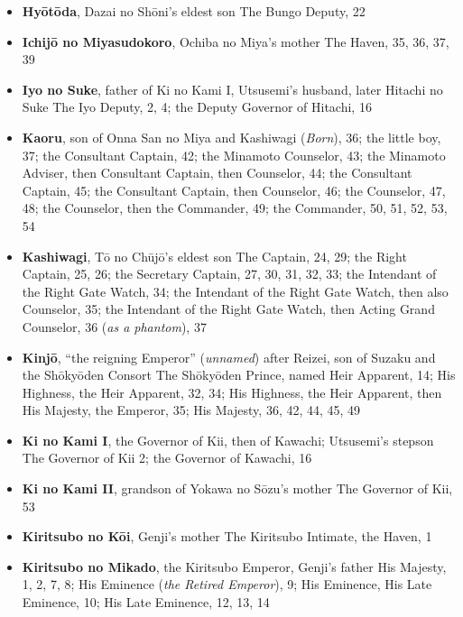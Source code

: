 \documentclass{article}
\begin{document}
\begin{multicols}{2}
\begin{itemize}[
			label=,
			leftmargin=0em,
			rightmargin=-1.5em,
			itemindent=-2em,
			nosep,
		]
		\item \textbf{Hyōtōda}, Dazai no Shōni's eldest son The Bungo Deputy, 22

		\item \textbf{Ichijō no Miyasudokoro}, Ochiba no Miya's mother The Haven, 35, 36, 37, 39

		\item \textbf{Iyo no Suke}, father of Ki no Kami I, Utsusemi's husband, later Hitachi no Suke The Iyo Deputy, 2, 4;
		      the Deputy Governor of Hitachi, 16

		\item \textbf{Kaoru}, son of Onna San no Miya and Kashiwagi (\textit{Born}), 36;
		      the little boy, 37;
		      the Consultant Captain, 42;
		      the Minamoto Counselor, 43;
		      the Minamoto Adviser, then Consultant Captain, then Counselor, 44;
		      the Consultant Captain, 45;
		      the Consultant Captain, then Counselor, 46;
		      the Counselor, 47, 48;
		      the Counselor, then the Commander, 49;
		      the Commander, 50, 51, 52, 53, 54

		\item \textbf{Kashiwagi}, Tō no Chūjō's eldest son The Captain, 24, 29;
		      the Right Captain, 25, 26;
		      the Secretary Captain, 27, 30, 31, 32, 33;
		      the Intendant of the Right Gate Watch, 34;
		      the Intendant of the Right Gate Watch, then also Counselor, 35;
		      the Intendant of the Right Gate Watch, then Acting Grand Counselor, 36 (\textit{as a phantom}), 37

		\item \textbf{Kinjō}, ``the reigning Emperor'' (\textit{unnamed}) after Reizei, son of Suzaku and the Shōkyōden Consort The Shōkyōden Prince, named Heir Apparent, 14;
		      His Highness, the Heir Apparent, 32, 34;
		      His Highness, the Heir Apparent, then His Majesty, the Emperor, 35;
		      His Majesty, 36, 42, 44, 45, 49

		\item \textbf{Ki no Kami I}, the Governor of Kii, then of Kawachi; Utsusemi's stepson The Governor of Kii 2;
		      the Governor of Kawachi, 16

		\item \textbf{Ki no Kami II}, grandson of Yokawa no Sōzu's mother The Governor of Kii, 53

		\item \textbf{Kiritsubo no Kōi}, Genji's mother The Kiritsubo Intimate, the Haven, 1

		\item \textbf{Kiritsubo no Mikado}, the Kiritsubo Emperor, Genji's father His Majesty, 1, 2, 7, 8;
		      His Eminence (\textit{the Retired Emperor}), 9;
		      His Eminence, His Late Eminence, 10;
		      His Late Eminence, 12, 13, 14


\end{itemize}
\end{multicols}
\end{document}
